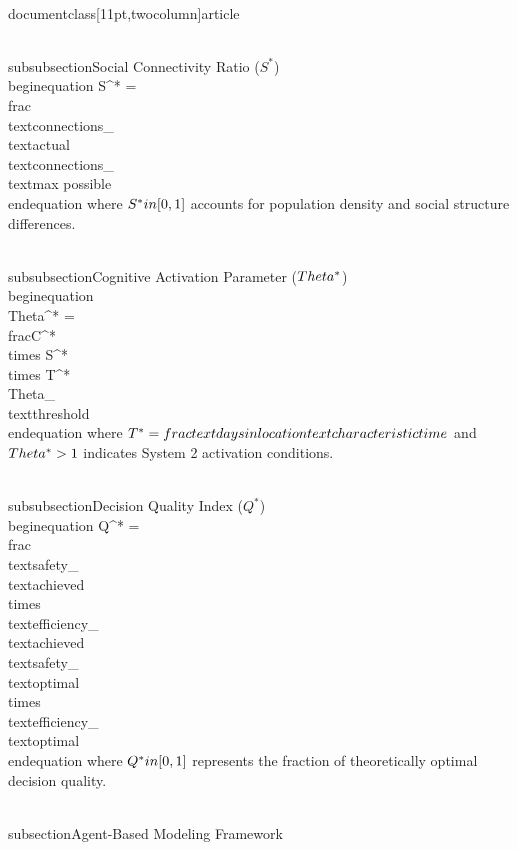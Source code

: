 \\documentclass[11pt,twocolumn]{article}
\begin{document}
\\subsubsection{Social Connectivity Ratio ($S^*$)}
\\begin{equation}
S^* = \\frac{\\text{connections}_{\\text{actual}}}{\\text{connections}_{\\text{max possible}}}
\\end{equation}
where $S^* \\in [0,1]$ accounts for population density and social structure differences.

\\subsubsection{Cognitive Activation Parameter ($\\Theta^*$)}
\\begin{equation}
\\Theta^* = \\frac{C^* \\times S^* \\times T^*}{\\Theta_{\\text{threshold}}}
\\end{equation}
where $T^* = \\frac{\\text{days in location}}{\\text{characteristic time}}$ and $\\Theta^* > 1$ indicates System 2 activation conditions.

\\subsubsection{Decision Quality Index ($Q^*$)}
\\begin{equation}
Q^* = \\frac{\\text{safety}_{\\text{achieved}} \\times \\text{efficiency}_{\\text{achieved}}}{\\text{safety}_{\\text{optimal}} \\times \\text{efficiency}_{\\text{optimal}}}
\\end{equation}
where $Q^* \\in [0,1]$ represents the fraction of theoretically optimal decision quality.

\\subsection{Agent-Based Modeling Framework}
\end{document}
